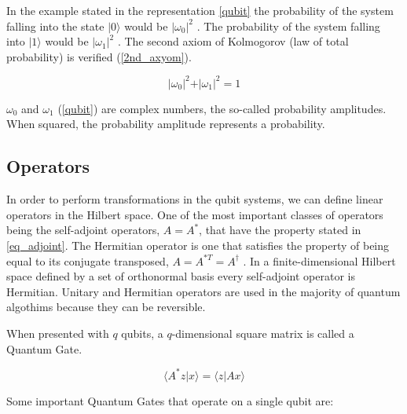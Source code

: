 In the example stated in the representation \ref{qubit} the probability of the system falling into the state $\vert 0 \rangle $ would be $\vert\omega_{0}\vert^{2}$ . The probability of the system falling into $\vert 1 \rangle $ would be $\vert\omega_{1}\vert^{2}$ . The second axiom of Kolmogorov (law of total probability) is verified (\ref{2nd_axyom}).

\begin{equation}
\label{2nd_axyom}
\vert\omega_{0}\vert^{2}+\vert\omega_{1}\vert^{2}=1
\end{equation}

 
$\omega_{0}$ and $\omega_{1}$ (\ref{qubit}) are complex numbers, the so-called probability amplitudes. When squared, the probability amplitude represents a probability. 

\subsection{Operators}
\label{subsec:QCoperators}

In order to perform transformations in the qubit systems, we can define linear operators in the Hilbert space. One of the most important classes of operators being the self-adjoint operators,  $A = A^{*}$, that have the property stated in \ref{eq_adjoint}. The Hermitian operator is one that satisfies the property of being equal to its conjugate transposed, $A = A^{*T} =A^\dagger$ .  In a finite-dimensional Hilbert space defined by a set of orthonormal basis every self-adjoint operator is Hermitian. Unitary and Hermitian operators are used in the majority of quantum algothims because they can be reversible. 

When presented with $q$ qubits, a $q$-dimensional square matrix is called a Quantum Gate.

\begin{equation}
\label{eq_adjoint}
\langle A^{*}z\vert x\rangle=\langle z\vert Ax\rangle
\end{equation}

Some important Quantum Gates that operate on a single qubit are:

